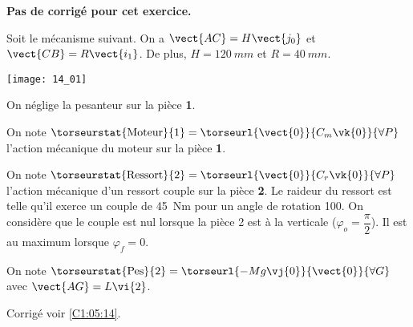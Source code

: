 \normalfalse \difficiletrue \tdifficilefalse
\correctionfalse


\setcounter{numques}{0}
\ifcorrection
\else
\textbf{Pas de corrigé pour cet exercice.}
\fi

\ifprof
\else
Soit le mécanisme suivant. On a $\vect{AC}=H\vect{j_0}$ et $\vect{CB}=R\vect{i_1}$. De plus, 
$H=\SI{120}{mm}$ et $R=\SI{40}{mm}$. 

\begin{center}
\texttt{[image: 14\_01]}
\end{center}
\fi

On néglige la pesanteur sur la pièce \textbf{1}. 

On note $\torseurstat{\text{Moteur}}{1} = \torseurl{\vect{0}}{C_m\vk{0}}{\forall P}$ l'action mécanique du moteur sur la pièce \textbf{1}.

On note $\torseurstat{\text{Ressort}}{2} = \torseurl{\vect{0}}{C_r\vk{0}}{\forall P}$ l'action mécanique d'un ressort couple sur la pièce \textbf{2}. Le raideur du ressort est telle qu'il exerce un couple de \SI{45}{Nm} pour un angle de rotation 100\degres. On considère que le couple est nul lorsque la pièce 2 est à la verticale ($\varphi_o=\dfrac{\pi}{2}$). Il est au maximum lorsque $\varphi_f=0$.

On note $\torseurstat{\text{Pes}}{2} = \torseurl{-Mg\vj{0}}{\vect{0}}{\forall G}$ avec $\vect{AG}=L\vi{2}$. 

\ifprof
\else
\fi

\ifprof
\else
\fi

\ifprof
\else
\fi


\ifprof
\else
\begin{flushright}
\footnotesize{Corrigé  voir \ref{C1:05:14}.}
\end{flushright}%
\fi